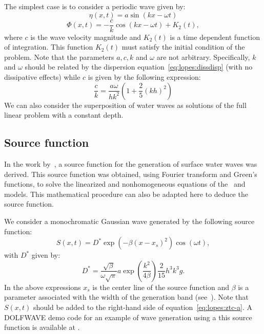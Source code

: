 The simplest case is to consider a periodic wave given by:
\begin{equation}\label{eq:lopes:dirichleteta}
\eta(x,t)=a \sin(kx-\omega t)
\end{equation}
\begin{equation}\label{eq:lopes:dirichletphi}
\Phi(x,t)=-\frac{c}{k}\cos(k x-\omega t)+K_2(t),
\end{equation}
where $c$ is the wave velocity magnitude and $K_2(t)$ is a
time dependent function of integration.  This function
$K_2(t)$ must satisfy the initial condition of the problem.
Note that the parameters $a,c,k$ and $\omega$ are not
arbitrary. Specifically, $k$ and $\omega$ should be related
by the dispersion equation~\eqref{eq:lopes:dissdisp} (with no
dissipative effects) while $c$ is given by the following
expression:
\begin{equation}
\frac{c}{k}=\frac{a\omega}{hk^2}\left(1+\frac{2}{5}(kh)^2\right)
\end{equation}
  We can also
consider the superposition of water waves as solutions of
the full linear problem with a constant depth.

\subsection{Source function}
In the work by~\citet{WeiKirbySinha1999}, a source
function for the generation of
surface water waves was derived.  This source function was
obtained, using Fourier transform and Green's functions, to
solve the linearized and nonhomogeneous equations of
the~\citet{Peregrine1967} and~\citet{Nwogu1993} models.  This
mathematical procedure can also be adapted here to deduce
the source function.

We consider a monochromatic Gaussian wave generated by the
following source function:
\begin{equation}\label{eq:lopes:src}
S(x,t)=D^* \exp(-\beta (x-x_s)^2)\cos(\omega t),
\end{equation}
with $D^*$ given by:
\begin{equation}
\displaystyle
D^*=\frac{\sqrt{\beta}}{\omega\sqrt{\pi}}a\exp(\frac{k^2}{4\beta})\frac{2}{15}h^3k^3g.
\end{equation}
In the above expressions $x_s$ is the center line of the source
function and $\beta$ is a parameter associated with the width of the
generation band (see~\citet{WeiKirbySinha1999}).  Note that $S(x,t)$
should be added to the right-hand side of
equation~\eqref{eq:lopes:ztc-a}.  A DOLFWAVE demo code for an example
of wave generation using a this source function is available
at .


